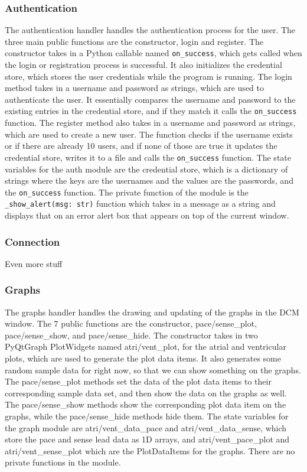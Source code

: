 \documentclass[12pt]{article}
\begin{document}
\subsubsection{Authentication}
The authentication handler handles the authentication process for the user.
The three main public functions are the constructor, login and register.
The constructor takes in a Python callable named \texttt{on\_success}, which gets called when the login or registration process is successful.
It also initializes the credential store, which stores the user credentials while the program is running.
The login method takes in a username and password as strings, which are used to authenticate the user.
It essentially compares the username and password to the existing entries in the credential store, and if they match it calls the \texttt{on\_success} function.
The register method also takes in a username and password as strings, which are used to create a new user.
The function checks if the username exists or if there are already 10 users, and if none of those are true it updates the credential store, writes it to a file and calls the \texttt{on\_success} function.
The state variables for the auth module are the credential store, which is a dictionary of strings where the keys are the usernames and the values are the passwords, and the \texttt{on\_success} function.
The private function of the module is the \texttt{\_show\_alert(msg: str)} function which takes in a message as a string and displays that on an error alert box that appears on top of the current window.
\subsubsection{Connection}
Even more stuff
\subsubsection{Graphs}
The graphs handler handles the drawing and updating of the graphs in the DCM window.
The 7 public functions are the constructor, pace/sense\_plot, pace/sense\_show, and pace/sense\_hide.
The constructor takes in two PyQtGraph PlotWidgets named atri/vent\_plot, for the atrial and ventricular plots, which are used to generate the plot data items.
It also generates some random sample data for right now, so that we can show something on the graphs.
The pace/sense\_plot methods set the data of the plot data items to their corresponding sample data set, and then show the data on the graphs as well.
The pace/sense\_show methods show the corresponding plot data item on the graphs, while the pace/sense\_hide methods hide them.
The state variables for the graph module are atri/vent\_data\_pace and atri/vent\_data\_sense, which store the pace and sense lead data as 1D arrays, and atri/vent\_pace\_plot and atri/vent\_sense\_plot which are the PlotDataItems for the graphs.
There are no private functions in the module.
\end{document}
